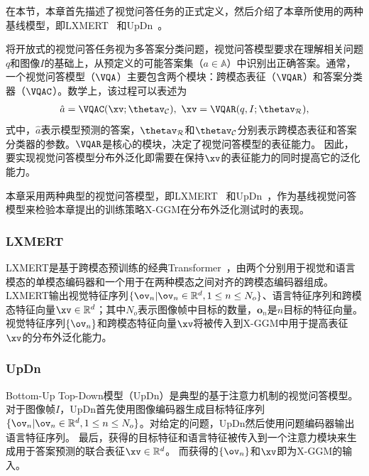 
在本节，本章首先描述了视觉问答任务的正式定义，然后介绍了本章所使用的两种基线模型，即LXMERT~\cite{tan2019lxmert} 和UpDn~\cite{anderson2018bottom}。

将开放式的视觉问答任务视为多答案分类问题，视觉问答模型要求在理解相关问题$q$和图像$I$的基础上，从预定义的可能答案集（$a \in \mathbb{A}$）中识别出正确答案。通常，一个视觉问答模型（$\VQA$）主要包含两个模块：跨模态表征（$\VQAR$）和答案分类器（$\VQAC$）。数学上，该过程可以表述为
\begin{equation}
\begin{aligned}
\hat{a} = \VQAC (\xv; \thetav_{\mathcal{C}}), ~\xv = \VQAR (q, I; \thetav_{\mathcal{R}}), 
\end{aligned}
\end{equation}
式中，$\hat{a}$表示模型预测的答案，$\thetav_{\mathcal{R}}$和$\thetav_{\mathcal{C}}$分别表示跨模态表征和答案分类器的参数。$\VQAR$是核心的模块，决定了视觉问答模型的表征能力。
因此，要实现视觉问答模型分布外泛化即需要在保持$\xv$的表征能力的同时提高它的泛化能力。

本章采用两种典型的视觉问答模型，即LXMERT~\cite{tan2019lxmert} 和UpDn~\cite{anderson2018bottom}，作为基线视觉问答模型来检验本章提出的训练策略X-GGM在分布外泛化测试时的表现。

\subsubsection{LXMERT}
LXMERT是基于跨模态预训练的经典Transformer~\cite{vaswani2017attention}，由两个分别用于视觉和语言模态的单模态编码器和一个用于在两种模态之间对齐的跨模态编码器组成。LXMERT输出视觉特征序列$\{\ov_n | \ov_n \in \mathbb{R}^d, 1 \le n \le N_o \}$、语言特征序列和跨模态特征向量$\xv \in \mathbb{R}^d$；其中$N_o$表示图像帧中目标的数量，$\bm{o}_n$是$n$目标的特征向量。视觉特征序列$\{\ov_n\}$和跨模态特征向量$\xv$将被传入到X-GGM中用于提高表征$\xv$的分布外泛化能力。

\subsubsection{UpDn}
Bottom-Up Top-Down模型（UpDn）是典型的基于注意力机制的视觉问答模型。
对于图像帧$I$，UpDn首先使用图像编码器生成目标特征序列$\{\ov_n | \ov_n \in \mathbb{R}^d , 1 \le n \le N_o\}$。对给定的问题，UpDn然后使用问题编码器输出语言特征序列。
最后，获得的目标特征和语言特征被传入到一个注意力模块来生成用于答案预测的联合表征$\xv \in \mathbb{R}^d$。
而获得的$\{\ov_n\}$和$\xv$即为X-GGM的输入。


